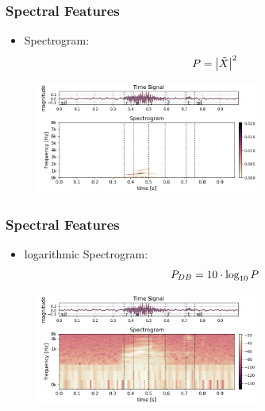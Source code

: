 \begin{frame}
  \frametitle{Spectral Features}
  \vspace{-0.5cm}
  \begin{itemize}
    \item Spectrogram:
    \begin{equation*}
      \footnotesize
      P = \abs{\tilde{X}}^2
    \end{equation*}
  \end{itemize}
  \begin{figure} \includegraphics[width=0.65\textwidth]{../3_signal/figs/signal_spec-lin_showcase_right0.png} \end{figure}
\end{frame}

\begin{frame}
  \frametitle{Spectral Features}
  \vspace{-0.5cm}
  \begin{itemize}
    \item logarithmic Spectrogram:
    \begin{equation*}
      \footnotesize
      P_{DB} = 10 \cdot \log_{10}{P}
    \end{equation*}
  \end{itemize}
  \begin{figure} \includegraphics[width=0.65\textwidth]{../3_signal/figs/signal_spec-log_showcase_right0.png} \end{figure}
\end{frame}

